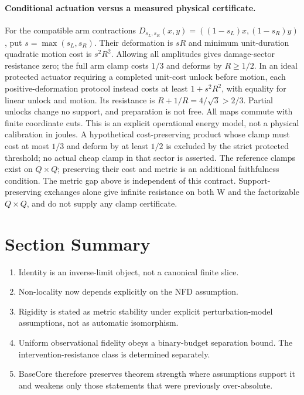 \paragraph{Conditional actuation versus a measured physical certificate.}
For the compatible arm contractions
$D_{s_L,s_R}(x,y)=((1-s_L)x,(1-s_R)y)$, put $s=\max(s_L,s_R)$.
Their deformation is $sR$ and minimum unit-duration quadratic motion cost is
$s^2R^2$. Allowing all amplitudes gives damage-sector resistance zero; the
full arm clamp costs $1/3$ and deforms by $R\ge1/2$.
In an ideal protected actuator requiring a completed unit-cost unlock before
motion, each positive-deformation protocol instead costs at least
$1+s^2R^2$, with equality for linear unlock and motion. Its resistance is
$R+1/R=4/\sqrt3>2/3$. Partial unlocks change no support, and preparation is
not free. All maps commute with finite coordinate cuts.
This is an explicit operational energy model, not a physical calibration in
joules. A hypothetical cost-preserving product whose clamp must cost at most
$1/3$ and deform by at least $1/2$ is excluded by the strict protected
threshold; no actual cheap clamp in that sector is asserted. The reference
clamps exist on $Q\times Q$; preserving their cost and metric is an additional
faithfulness condition. The metric gap above is independent of this contract.
Support-preserving exchanges alone give infinite resistance on both W and
the factorizable $Q\times Q$, and do not supply any clamp certificate.

\section{Section Summary}

\begin{enumerate}[leftmargin=*]
\item Identity is an inverse-limit object, not a canonical finite slice.
\item Non-locality now depends explicitly on the NFD assumption.
\item Rigidity is stated as metric stability under explicit perturbation-model assumptions, not as automatic isomorphism.
\item Uniform observational fidelity obeys a binary-budget separation bound. The intervention-resistance class is determined separately.
\item BaseCore therefore preserves theorem strength where assumptions support it and weakens only those statements that were previously over-absolute.
\end{enumerate}
